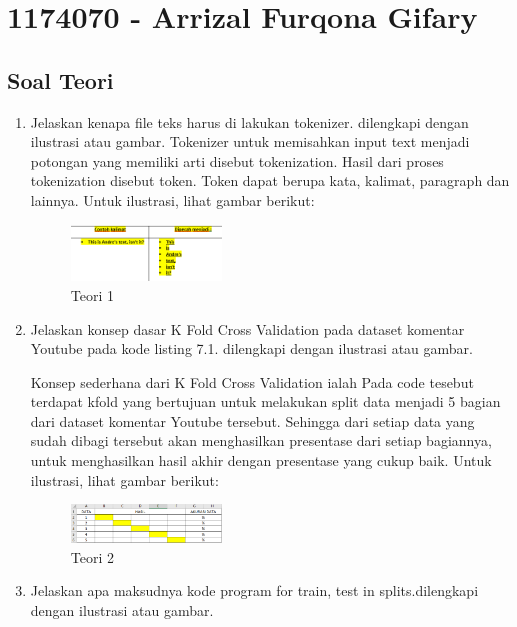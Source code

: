 \section{1174070 - Arrizal Furqona Gifary}
\subsection{Soal Teori}
\begin{enumerate}

	\item Jelaskan kenapa file teks harus di lakukan tokenizer. dilengkapi dengan ilustrasi atau gambar.
	\hfill\break
	Tokenizer untuk memisahkan input text menjadi potongan yang memiliki arti disebut tokenization. Hasil dari proses tokenization disebut token. Token dapat berupa kata, kalimat, paragraph dan lainnya. Untuk ilustrasi, lihat gambar berikut: 

	\begin{figure}[H]
	\centering
		\includegraphics[width=4cm]{figures/1174070/7/materi/teori1.PNG}
		\caption{Teori 1}
	\end{figure}

	\item Jelaskan konsep dasar K Fold Cross Validation pada dataset komentar Youtube pada kode listing 7.1. dilengkapi dengan ilustrasi atau gambar.

	

	\hfill\break
	Konsep sederhana dari K Fold Cross Validation ialah Pada code tesebut terdapat kfold yang bertujuan untuk melakukan split data menjadi 5 bagian dari dataset komentar Youtube tersebut. Sehingga dari setiap data yang sudah dibagi tersebut akan menghasilkan presentase dari setiap bagiannya, untuk menghasilkan hasil akhir dengan presentase yang cukup baik. Untuk ilustrasi, lihat gambar berikut: 

	\begin{figure}[H]
	\centering
		\includegraphics[width=4cm]{figures/1174070/7/materi/teori2.PNG}
		\caption{Teori 2}
	\end{figure}
	
	\item Jelaskan apa maksudnya kode program for train, test in splits.dilengkapi dengan ilustrasi atau gambar.


\end{enumerate}
